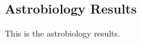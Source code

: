 \subsection{Astrobiology Results}
\label{sec:Astrobiology-Results}
This is the astrobiology results.
